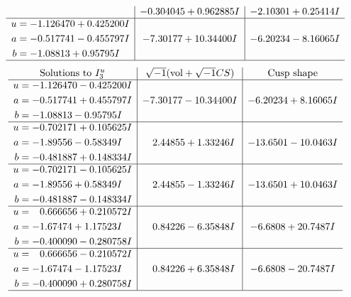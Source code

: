 \documentclass[1p]{elsarticle_modified}
\theoremstyle{definition}
\newcommand{\I}{\sqrt{-1}}
\begin{document}
$$\begin{array}{c|c|c}
 & -0.304045 + 0.962885 I & -2.10301 + 0.25414 I \\ \hline\begin{aligned}
u &= -1.126470 + 0.425200 I \\
a &= -0.517741 - 0.455797 I \\
b &= -1.08813 + 0.95795 I\end{aligned}
 & -7.30177 + 10.34400 I & -6.20234 - 8.16065 I\\
 \hline 
 \end{array}$$\newpage$$\begin{array}{c|c|c}  
\text{Solutions to }I^u_{3}& \I (\text{vol} + \sqrt{-1}CS) & \text{Cusp shape}\\
 \hline 
\begin{aligned}
u &= -1.126470 - 0.425200 I \\
a &= -0.517741 + 0.455797 I \\
b &= -1.08813 - 0.95795 I\end{aligned}
 & -7.30177 - 10.34400 I & -6.20234 + 8.16065 I \\ \hline\begin{aligned}
u &= -0.702171 + 0.105625 I \\
a &= -1.89556 - 0.58349 I \\
b &= -0.481887 + 0.148334 I\end{aligned}
 & \phantom{-}2.44855 + 1.33246 I & -13.6501 - 10.0463 I \\ \hline\begin{aligned}
u &= -0.702171 - 0.105625 I \\
a &= -1.89556 + 0.58349 I \\
b &= -0.481887 - 0.148334 I\end{aligned}
 & \phantom{-}2.44855 - 1.33246 I & -13.6501 + 10.0463 I \\ \hline\begin{aligned}
u &= \phantom{-}0.666656 + 0.210572 I \\
a &= -1.67474 + 1.17523 I \\
b &= -0.400090 - 0.280758 I\end{aligned}
 & \phantom{-}0.84226 - 6.35848 I & -6.6808 + 20.7487 I \\ \hline\begin{aligned}
u &= \phantom{-}0.666656 - 0.210572 I \\
a &= -1.67474 - 1.17523 I \\
b &= -0.400090 + 0.280758 I\end{aligned}
 & \phantom{-}0.84226 + 6.35848 I & -6.6808 - 20.7487 I\\
 \hline 
 \end{array}$$\newpage\newpage\renewcommand{\arraystretch}{1}
\end{document}
